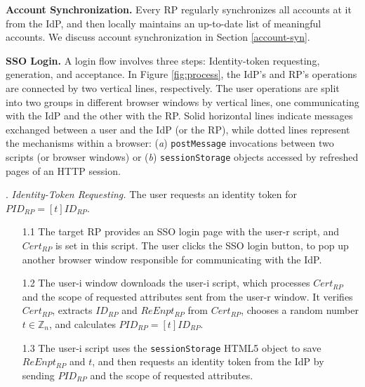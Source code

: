 \noindent\textbf{Account Synchronization.} 
Every RP regularly synchronizes all accounts at it from the IdP,
    and then locally maintains an up-to-date list of meaningful accounts.
We discuss account synchronization in Section \ref{account-syn}.


\noindent\textbf{SSO Login.} 
A login flow %
involves three steps: Identity-token requesting, generation, and acceptance.
In Figure \ref{fig:process}, the IdP's and RP's operations are connected by two vertical lines, respectively. The user operations are split into two groups in different browser windows by vertical lines, one communicating with the IdP and the other with the RP. Solid horizontal lines indicate messages exchanged between a user and the IdP (or the RP), while dotted lines represent the mechanisms within a browser:
(\emph{a}) \verb+postMessage+ invocations between two scripts (or browser windows)
or (\emph{b}) \verb+sessionStorage+ objects accessed by refreshed pages of an HTTP session.


. {\em Identity-Token Requesting.}
The user requests an identity token for $PID_{RP} = [t]{ID_{RP}}$.
\begin{itemize}
\setlength{\topsep}{0pt}
\setlength{\partopsep}{0pt}
\setlength{\itemsep}{0pt}
\setlength{\parsep}{0pt}
\setlength{\parskip}{0pt}
\item[1.1]
The target RP provides an SSO login page with the user-r script,
    and $Cert_{RP}$ is set in this script.
The user clicks the SSO login button,
    to pop up another browser window responsible for communicating with the IdP.
\item[1.2] The user-i window downloads the user-i script,
which processes $Cert_{RP}$ and the scope of requested attributes sent from the user-r window.
It verifies $Cert_{RP}$, extracts $ID_{RP}$ and $ReEnpt_{RP}$ from $Cert_{RP}$, 
chooses a random number $t \in \mathbb{Z}_n$,
    and calculates $PID_{RP}=[t]{ID_{RP}}$.
\item[1.3] 
The user-i script uses the \verb+sessionStorage+ HTML5 object to save $ReEnpt_{RP}$ and $t$,
    and then requests an identity token from the IdP by sending $PID_{RP}$ and the scope of requested attributes.
\end{itemize}


